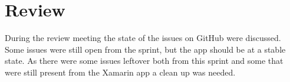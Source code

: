 \section{Review}
During the review meeting the state of the issues on GitHub were discussed.
Some issues were still open from the sprint, but the app should be at a stable state.
As there were some issues leftover both from this sprint and some that were still present from the Xamarin app a clean up was needed.
